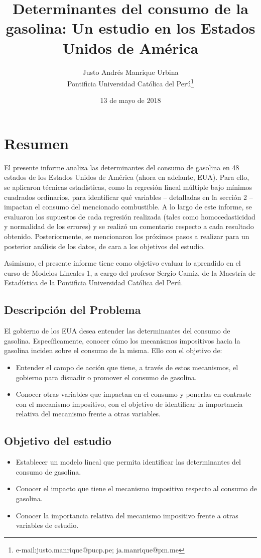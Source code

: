 \documentclass[a4paper,10pt]{article}\usepackage[]{graphicx}\usepackage[]{color}
\title{Determinantes del consumo de la gasolina: Un estudio en los Estados Unidos de América}
\author{Justo Andrés Manrique Urbina\\Pontificia Universidad Católica del Perú\thanks{e-mail:justo.manrique@pucp.pe; ja.manrique@pm.me}}
\date{13 de mayo de 2018}
\begin{document}
 
\maketitle
\section{Resumen}
  El presente informe analiza las determinantes del consumo de gasolina en 48 estados de los Estados Unidos de América (ahora en adelante, EUA). Para ello, se aplicaron técnicas estadísticas, como la regresión lineal múltiple bajo mínimos cuadrados ordinarios, para identificar qué variables -- detalladas en la sección 2 -- impactan el consumo del mencionado combustible. A lo largo de este informe, se evaluaron los supuestos de cada regresión realizada (tales como homocedasticidad y normalidad de los errores) y se realizó un comentario respecto a cada resultado obtenido. Posteriormente, se mencionaron los próximos pasos a realizar para un posterior análisis de los datos, de cara a los objetivos del estudio.
  
  Asimismo, el presente informe tiene como objetivo evaluar lo aprendido en el curso de Modelos Lineales 1, a cargo del profesor Sergio Camiz, de la Maestría de Estadística de la Pontificia Universidad Católica del Perú.

	\subsection{Descripción del Problema}
		El gobierno de los EUA desea entender las determinantes del consumo de gasolina. Específicamente, conocer cómo los mecanismos impositivos hacia la gasolina inciden sobre el consumo de la misma. Ello con el objetivo de:
		\begin{itemize}
			\item Entender el campo de acción que tiene, a través de estos mecanismos, el gobierno para disuadir o promover el consumo de gasolina.
			\item Conocer otras variables que impactan en el consumo y ponerlas en contraste con el mecanismo impositivo, con el objetivo de identificar la importancia relativa del mecanismo frente a otras variables.
		\end{itemize}
	\subsection{Objetivo del estudio}
		 \begin{itemize}
		 	\item Establecer un modelo lineal que permita identificar las determinantes del consumo de gasolina.
		 	\item Conocer el impacto que tiene el mecanismo impositivo respecto al consumo de gasolina.
		 	\item Conocer la importancia relativa del mecanismo impositivo frente a otras variables de estudio.
		 \end{itemize}
\end{document}
